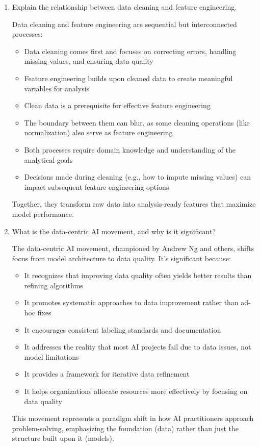 \documentclass[12pt]{article}
\begin{document}
\begin{enumerate}
    \item Explain the relationship between data cleaning and feature engineering.
    
    \begin{tcolorbox}[colback=blue!5!white,colframe=blue!75!black,title=Solution]
    Data cleaning and feature engineering are sequential but interconnected processes:
    \begin{itemize}
        \item Data cleaning comes first and focuses on correcting errors, handling missing values, and ensuring data quality
        \item Feature engineering builds upon cleaned data to create meaningful variables for analysis
        \item Clean data is a prerequisite for effective feature engineering
        \item The boundary between them can blur, as some cleaning operations (like normalization) also serve as feature engineering
        \item Both processes require domain knowledge and understanding of the analytical goals
        \item Decisions made during cleaning (e.g., how to impute missing values) can impact subsequent feature engineering options
    \end{itemize}
    Together, they transform raw data into analysis-ready features that maximize model performance.
    \end{tcolorbox}
    
    \item What is the data-centric AI movement, and why is it significant?
    
    \begin{tcolorbox}[colback=blue!5!white,colframe=blue!75!black,title=Solution]
    The data-centric AI movement, championed by Andrew Ng and others, shifts focus from model architecture to data quality. It's significant because:
    \begin{itemize}
        \item It recognizes that improving data quality often yields better results than refining algorithms
        \item It promotes systematic approaches to data improvement rather than ad-hoc fixes
        \item It encourages consistent labeling standards and documentation
        \item It addresses the reality that most AI projects fail due to data issues, not model limitations
        \item It provides a framework for iterative data refinement
        \item It helps organizations allocate resources more effectively by focusing on data quality
    \end{itemize}
    This movement represents a paradigm shift in how AI practitioners approach problem-solving, emphasizing the foundation (data) rather than just the structure built upon it (models).
    \end{tcolorbox}
    

\end{enumerate}
\end{document}
